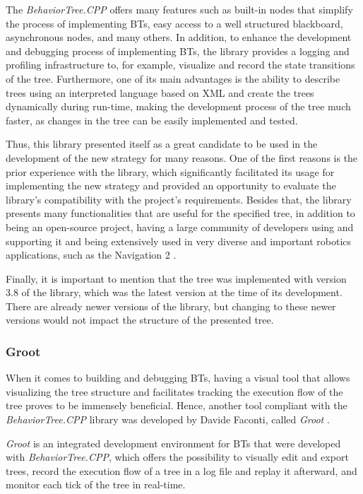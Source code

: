 The \textit{BehaviorTree.CPP} offers many features such as built-in nodes that simplify the process of implementing BTs, easy access to a well structured blackboard, asynchronous nodes, and many others. In addition, to enhance the development and debugging process of implementing BTs, the library provides a logging and profiling infrastructure to, for example, visualize and record the state transitions of the tree. Furthermore, one of its main advantages is the ability to describe trees using an interpreted language based on XML and create the trees dynamically during run-time, making the development process of the tree much faster, as changes in the tree can be easily implemented and tested.

Thus, this library presented itself as a great candidate to be used in the development of the new strategy for many reasons. One of the first reasons is the prior experience with the library, which significantly facilitated its usage for implementing the new strategy and provided an opportunity to evaluate the library's compatibility with the project's requirements. Besides that, the library presents many functionalities that are useful for the specified tree, in addition to being an open-source project, having a large community of developers using and supporting it and being extensively used in very diverse and important robotics applications, such as the Navigation 2 \cite{nav2}.

Finally, it is important to mention that the tree was implemented with version 3.8 of the library, which was the latest version at the time of its development. There are already newer versions of the library, but changing to these newer versions would not impact the structure of the presented tree.

\subsubsection{Groot}
\label{subsubsec:groot}

When it comes to building and debugging BTs, having a visual tool that allows visualizing the tree structure and facilitates tracking the execution flow of the tree proves to be immensely beneficial. Hence, another tool compliant with the \textit{BehaviorTree.CPP} library was developed by Davide Faconti, called \textit{Groot} \cite{Groot}.

\textit{Groot} is an integrated development environment for BTs that were developed with \textit{BehaviorTree.CPP}, which offers the possibility to visually edit and export trees, record the execution flow of a tree in a log file and replay it afterward, and monitor each tick of the tree in real-time.

